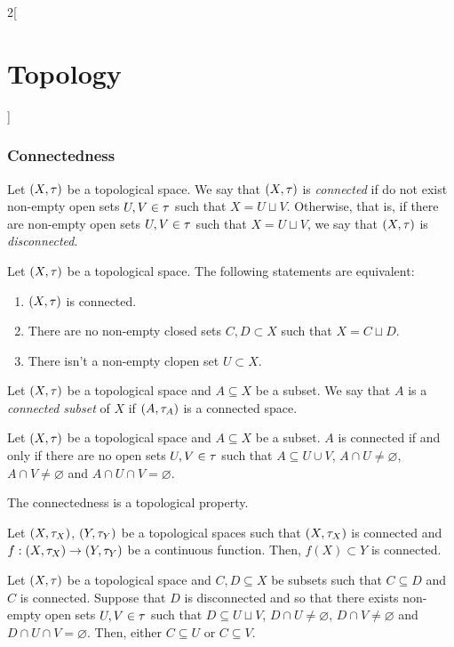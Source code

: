 \documentclass[../../../main.tex]{subfiles}
\begin{document}
\begin{multicols}{2}[\section{Topology}]
  \subsubsection{Connectedness}
  \begin{definition}
    Let $(X,\tau)$ be a topological space. We say that $(X,\tau)$ is \emph{connected} if do not exist non-empty open sets $U,V\in\tau$ such that $X=U\sqcup V$. Otherwise, that is, if there are non-empty open sets $U,V\in\tau$ such that $X=U\sqcup V$, we say that $(X,\tau)$ is \emph{disconnected}.
  \end{definition}
  \begin{prop}
    Let $(X,\tau)$ be a topological space. The following statements are equivalent:
    \begin{enumerate}
      \item $(X,\tau)$ is connected.
      \item There are no non-empty closed sets $C,D\subset X$ such that $X=C\sqcup D$.
      \item There isn't a non-empty clopen set $U\subset X$.
    \end{enumerate}
  \end{prop}
  \begin{definition}
    Let $(X,\tau)$ be a topological space and $A\subseteq X$ be a subset. We say that $A$ is a \emph{connected subset} of $X$ if $(A,\tau_A)$ is a connected space.
  \end{definition}
  \begin{prop}
    Let $(X,\tau)$ be a topological space and $A\subseteq X$ be a subset. $A$ is connected if and only if there are no open sets $U,V\in \tau$ such that $A\subseteq U\cup V$, $A\cap U\ne\varnothing$, $A\cap V\ne\varnothing$ and $A\cap U\cap V=\varnothing$.
  \end{prop}
  \begin{prop}
    The connectedness is a topological property.
  \end{prop}
  \begin{theorem}
    Let $(X,\tau_X)$, $(Y,\tau_Y)$ be a topological spaces such that $(X,\tau_X)$ is connected and $f:(X,\tau_X)\rightarrow(Y,\tau_Y)$ be a continuous function. Then, $f(X)\subset Y$ is connected.
  \end{theorem}
  \begin{lemma}
    Let $(X,\tau)$ be a topological space and $C,D\subseteq X$ be subsets such that $C\subseteq D$ and $C$ is connected. Suppose that $D$ is disconnected and so that there exists non-empty open sets $U,V\in\tau$ such that $D\subseteq U\sqcup V$, $D\cap U\ne\varnothing$, $D\cap V\ne\varnothing$ and $D\cap U\cap V=\varnothing$. Then, either $C\subseteq U$ or $C\subseteq V$.

\end{lemma}
\end{multicols}
\end{document}
